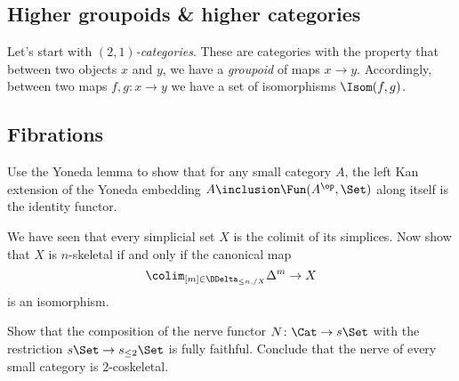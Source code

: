 \subsection{Higher groupoids \& higher categories \inc}%
\label{sub:Highergroupoidshighercategories}
Let's start with \emph{$(2,1)$-categories}.
These are categories with the property that between two objects $x$ and $y$, we have a \emph{groupoid} of maps $x \to y$.
Accordingly, between two maps $f,g \colon x \to y$ we have a set of isomorphisms $\Isom(f,g)$.

\subsection{Fibrations \inc}%
\label{sub:Fibrations}

\begin{exercises}
  \item%
    \label{exercise:stronggeneration}
    Use the Yoneda lemma to show that for any small category $A$,
    the left Kan extension of the Yoneda embedding $A \inclusion \Fun(A^{\op}, \Set)$ along itself is the identity functor.
  \item%
    \label{exercise:nskeletonascolimit}
    We have seen that every simplicial set $X$ is the colimit of its simplices.
    Now show that $X$ is $n$-skeletal if and only if the canonical map
    \[
      \colim_{[m] \in \DDelta_{\leq n, /X}} \Delta^m \to X
    \]
    is an isomorphism.
  \item%
    \label{exercise:nerve2cosk}
    Show that the composition of the nerve functor $N \colon \Cat \to s\Set$ with the restriction $s\Set \to s_{\leq 2}\Set$ is fully faithful.
    Conclude that the nerve of every small category is $2$-coskeletal.
\end{exercises}


